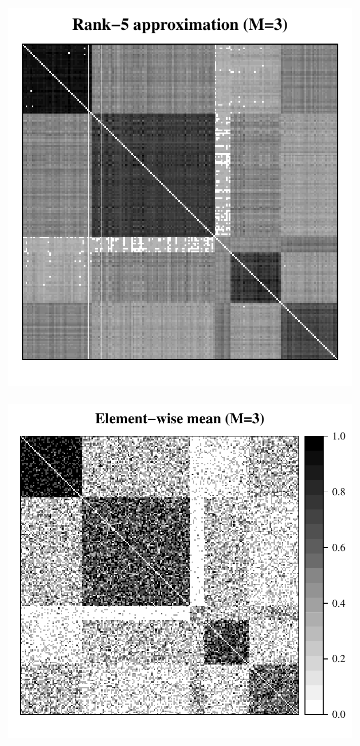 \documentclass[10pt,letterpaper]{article}
\begin{document}
\begin{figure}
\begin{subfigure}{.45\textwidth}
\end{subfigure}
\begin{subfigure}{.45\textwidth}
  \centering
  \includegraphics[height=\linewidth]{SBM_Phat.pdf}
\end{subfigure}%
\begin{subfigure}{.45\textwidth}
  \centering
  \includegraphics[height=\linewidth]{SBM_Abar.pdf}

\end{subfigure}
\end{figure}
\end{document}
